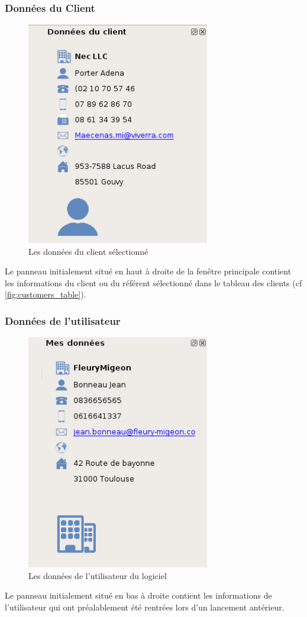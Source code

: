 \subsubsection{Données du Client}
\begin{figure}[H]
	\centering
	\includegraphics[width=8cm]{screens/dockDroite.png}
	\caption{Les données du client sélectionné}
	\label{fig:customer_data}
\end{figure}
Le panneau initialement situé en haut à droite de la fenêtre principale contient les informations du client ou du référent
sélectionné dans le tableau des clients (cf \ref{fig:customers_table}).

\subsubsection{Données de l'utilisateur}
\begin{figure}[H]
	\centering
	\includegraphics[width=8cm]{screens/dockUtilisateur.png}
	\caption{Les données de l'utilisateur du logiciel}
	\label{fig:user_data}
\end{figure}
Le panneau initialement situé en bas à droite contient les informations de l’utilisateur qui ont préalablement été rentrées lors d'un lancement antérieur.

